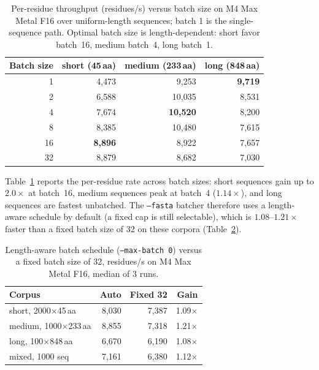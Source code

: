 \documentclass{article}
\begin{document}
\begin{table}
  \centering
  \caption{Per-residue throughput (residues/s) versus batch size on M4 Max Metal F16 over uniform-length sequences; batch 1 is the single-sequence path. Optimal batch size is length-dependent: short favor batch~16, medium batch~4, long batch~1.}
  \label{tab:batch-residues}
  \begin{tabular}{rrrr}
    \toprule
    Batch size & short (45\,aa) & medium (233\,aa) & long (848\,aa) \\
    \midrule
    1  & 4{,}473 & 9{,}253  & \textbf{9{,}719} \\
    2  & 6{,}588 & 10{,}035 & 8{,}531 \\
    4  & 7{,}674 & \textbf{10{,}520} & 8{,}200 \\
    8  & 8{,}385 & 10{,}480 & 7{,}615 \\
    16 & \textbf{8{,}896} & 8{,}922 & 7{,}657 \\
    32 & 8{,}879 & 8{,}682 & 7{,}030 \\
    \bottomrule
  \end{tabular}
\end{table}

Table~\ref{tab:batch-residues} reports the per-residue rate across batch sizes: short sequences gain up to $2.0\times$ at batch~16, medium sequences peak at batch~4 ($1.14\times$), and long sequences are fastest unbatched. The \texttt{--fasta} batcher therefore uses a length-aware schedule by default (a fixed cap is still selectable), which is $1.08$--$1.21\times$ faster than a fixed batch size of 32 on these corpora (Table~\ref{tab:batch-schedule}).

\begin{table}
  \centering
  \caption{Length-aware batch schedule (\texttt{--max-batch 0}) versus a fixed batch size of 32, residues/s on M4 Max Metal F16, median of 3 runs.}
  \label{tab:batch-schedule}
  \begin{tabular}{lrrr}
    \toprule
    Corpus & Auto & Fixed 32 & Gain \\
    \midrule
    short, 2000$\times$45\,aa   & 8{,}030 & 7{,}387 & 1.09$\times$ \\
    medium, 1000$\times$233\,aa & 8{,}855 & 7{,}318 & 1.21$\times$ \\
    long, 100$\times$848\,aa    & 6{,}670 & 6{,}190 & 1.08$\times$ \\
    mixed, 1000 seq             & 7{,}161 & 6{,}380 & 1.12$\times$ \\
    \bottomrule
  \end{tabular}
\end{table}
\end{document}
